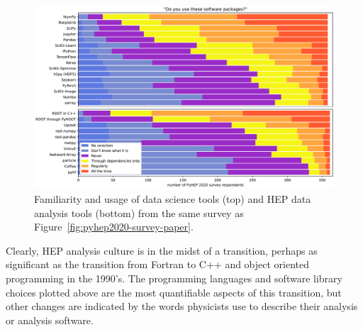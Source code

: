 \documentclass{article}
\begin{document}
\begin{figure}
\centering
\includegraphics[width=0.8\linewidth]{fig/lhlhc-familiarity-with-packages-paper.pdf}

\caption{Familiarity and usage of data science tools (top) and HEP data analysis tools (bottom) from the same survey as Figure~\ref{fig:pyhep2020-survey-paper}. \label{fig:lhlhc-familiarity-with-packages-paper}}
\end{figure}

Clearly, HEP analysis culture is in the midst of a transition, perhaps as significant as the transition from Fortran to C++ and object oriented programming in the 1990's. The programming languages and software library choices plotted above are the most quantifiable aspects of this transition, but other changes are indicated by the words physicists use to describe their analysis or analysis software.
\end{document}
